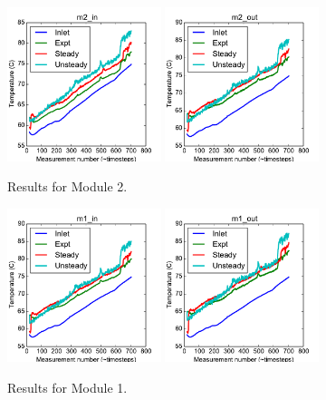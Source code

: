 \documentclass{article}
\begin{document}
\clearpage
\begin{figure}[!ht]
\centering
\includegraphics[width=0.4\textwidth]{../../data/ICSolar/images/Feb11_m2_in_compare.pdf}\hspace{0.05\textwidth}
\includegraphics[width=0.4\textwidth]{../../data/ICSolar/images/Feb11_m2_out_compare.pdf}\hspace{0.05\textwidth}\\
\caption{Results for Module 2.}\end{figure}
\begin{figure}[!ht]
\centering
\includegraphics[width=0.4\textwidth]{../../data/ICSolar/images/Feb11_m1_in_compare.pdf}\hspace{0.05\textwidth}
\includegraphics[width=0.4\textwidth]{../../data/ICSolar/images/Feb11_m1_out_compare.pdf}\hspace{0.05\textwidth}\\
\caption{Results for Module 1.}\end{figure}
\end{document}
